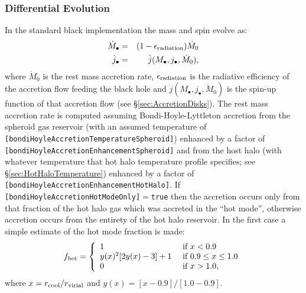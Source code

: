\subsubsection{Differential Evolution}

In the standard black implementation the mass and spin evolve as:
\begin{eqnarray}
\dot{M}_\bullet &=& (1-\epsilon_{\rm radiation}) \dot{M}_0 \\
\dot{j}_\bullet &=& \dot{j}(M_\bullet,j_\bullet,\dot{M}_0),
\end{eqnarray}
where $\dot{M}_0$ is the rest mass accretion rate, $\epsilon_{\rm radiation}$ is the radiative efficiency of the accretion flow feeding the black hole and $\dot{j}(M_\bullet,j_\bullet,\dot{M}_0)$ is the spin-up function of that accretion flow (see \S\ref{sec:AccretionDisks}). The rest mass accretion rate is computed assuming Bondi-Hoyle-Lyttleton accretion from the spheroid gas reservoir (with an assumed temperature of {\tt [bondiHoyleAccretionTemperatureSpheroid]}) enhanced by a factor of {\tt [bondiHoyleAccretionEnhancementSpheroid]} and from the host halo (with whatever temperature that hot halo temperature profile specifies; see \S\ref{sec:HotHaloTemperature}) enhanced by a factor of {\tt [bondiHoyleAccretionEnhancementHotHalo]}. If {\tt [bondiHoyleAccretionHotModeOnly]}$=${\tt true} then the accretion occurs only from that fraction of the hot halo gas which was accreted in the ``hot mode'', otherwise accretion occurs from the entirety of the hot halo reservoir. In the first case a simple estimate of the hot mode fraction is made:
\begin{equation}
f_{\rm hot} = \left\{ \begin{array}{ll} 1 & \hbox{ if } x < 0.9 \\ y(x)^2[2 y(x) - 3]+1  & \hbox{ if } 0.9 \le x \le 1.0 \\ 0 & \hbox{ if } x > 1.0, \end{array} \right.
\end{equation}
where $x = r_{\rm cool}/r_{\rm virial}$ and $y(x)=[x-0.9]/[1.0-0.9]$.

